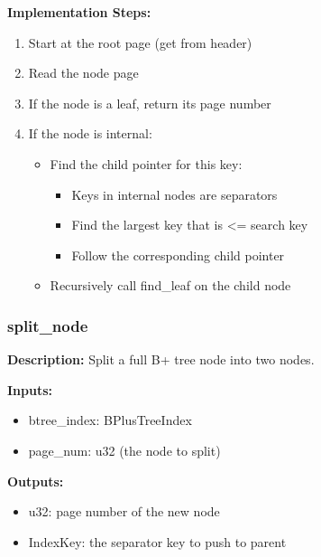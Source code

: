 \documentclass[11pt,a4paper]{article}
\begin{document}
\textbf{Implementation Steps:}
\begin{enumerate}
\item Start at the root page (get from header)
\item Read the node page
\item If the node is a leaf, return its page number
\item If the node is internal:
    \begin{itemize}
    \item Find the child pointer for this key:
        \begin{itemize}
        \item Keys in internal nodes are separators
        \item Find the largest key that is <= search key
        \item Follow the corresponding child pointer
        \end{itemize}
    \item Recursively call find\_leaf on the child node
    \end{itemize}
\end{enumerate}

\subsubsection{split\_node}

\textbf{Description:} Split a full B+ tree node into two nodes.

\textbf{Inputs:}
\begin{itemize}
\item btree\_index: BPlusTreeIndex
\item page\_num: u32 (the node to split)
\end{itemize}

\textbf{Outputs:}
\begin{itemize}
\item u32: page number of the new node
\item IndexKey: the separator key to push to parent
\end{itemize}
\end{document}
